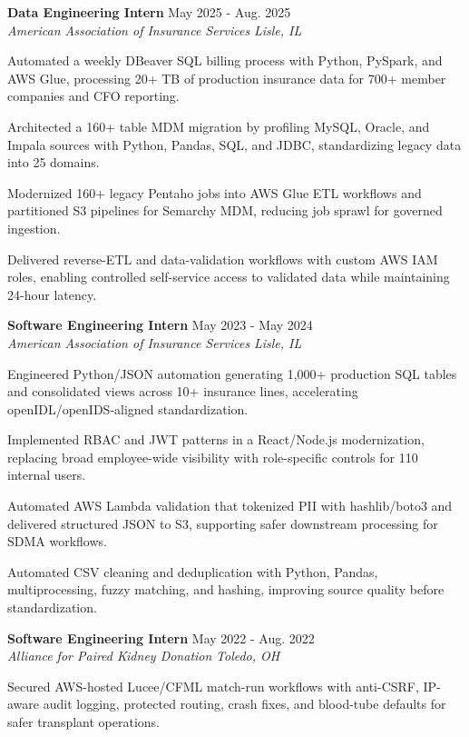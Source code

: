 \documentclass[letterpaper,11pt]{article}
\newcommand{\resumeSubheading}[4]{
  \textbf{#1} \hfill #2\\
  \textit{#3} \hfill \textit{#4}
}
\begin{document}
\resumeSubheading
{Data Engineering Intern}{May 2025 - Aug. 2025}
{American Association of Insurance Services}{Lisle, IL}
\begin{tightitemize}
  \item Automated a weekly DBeaver SQL billing process with Python, PySpark, and AWS Glue, processing 20+ TB of production insurance data for 700+ member companies and CFO reporting.
  \item Architected a 160+ table MDM migration by profiling MySQL, Oracle, and Impala sources with Python, Pandas, SQL, and JDBC, standardizing legacy data into 25 domains.
  \item Modernized 160+ legacy Pentaho jobs into AWS Glue ETL workflows and partitioned S3 pipelines for Semarchy MDM, reducing job sprawl for governed ingestion.
  \item Delivered reverse-ETL and data-validation workflows with custom AWS IAM roles, enabling controlled self-service access to validated data while maintaining 24-hour latency.
\end{tightitemize}

\resumeSubheading
{Software Engineering Intern}{May 2023 - May 2024}
{American Association of Insurance Services}{Lisle, IL}
\begin{tightitemize}
  \item Engineered Python/JSON automation generating 1,000+ production SQL tables and consolidated views across 10+ insurance lines, accelerating openIDL/openIDS-aligned standardization.
  \item Implemented RBAC and JWT patterns in a React/Node.js modernization, replacing broad employee-wide visibility with role-specific controls for 110 internal users.
  \item Automated AWS Lambda validation that tokenized PII with hashlib/boto3 and delivered structured JSON to S3, supporting safer downstream processing for SDMA workflows.
  \item Automated CSV cleaning and deduplication with Python, Pandas, multiprocessing, fuzzy matching, and hashing, improving source quality before standardization.
\end{tightitemize}

\resumeSubheading
{Software Engineering Intern}{May 2022 - Aug. 2022}
{Alliance for Paired Kidney Donation}{Toledo, OH}
\begin{tightitemize}
  \item Secured AWS-hosted Lucee/CFML match-run workflows with anti-CSRF, IP-aware audit logging, protected routing, crash fixes, and blood-tube defaults for safer transplant operations.
\end{tightitemize}
\end{document}
